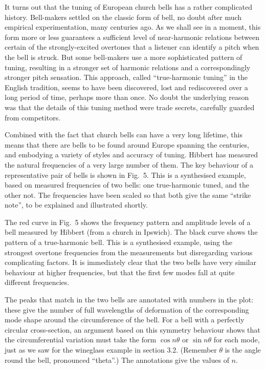   It turns out that the tuning of European church bells has a rather 
  complicated history. Bell-makers settled on the classic form of bell, no 
  doubt after much empirical experimentation, many centuries ago. As we shall 
  see in a moment, this form more or less guarantees a sufficient level of 
  near-harmonic relations between certain of the strongly-excited overtones 
  that a listener can identify a pitch when the bell is struck. But some 
  bell-makers use a more sophisticated pattern of tuning, resulting in a 
  stronger set of harmonic relations and a correspondingly stronger pitch 
  sensation. This approach, called ``true-harmonic tuning'' in the English 
  tradition, seems to have been discovered, lost and rediscovered over a long 
  period of time, perhaps more than once. No doubt the underlying reason was 
  that the details of this tuning method were trade secrets, carefully guarded 
  from competitors. 

  Combined with the fact that church bells can have a very long lifetime, this 
  means that there are bells to be found around Europe spanning the centuries, 
  and embodying a variety of styles and accuracy of tuning. Hibbert has 
  measured the natural frequencies of a very large number of them. The key 
  behaviour of a representative pair of bells is shown in Fig.\ 5. This is a 
  synthesised example, based on measured frequencies of two bells: one 
  true-harmonic tuned, and the other not. The frequencies have been scaled so 
  that both give the same ``strike note'', to be explained and illustrated 
  shortly. 

  The red curve in Fig.\ 5 shows the frequency pattern and amplitude levels of 
  a bell measured by Hibbert (from a church in Ipswich). The black curve shows 
  the pattern of a true-harmonic bell. This is a synthesised example, using the 
  strongest overtone frequencies from the measurements but disregarding various 
  complicating factors. It is immediately clear that the two bells have very 
  similar behaviour at higher frequencies, but that the first few modes fall at 
  quite different frequencies. 

  The peaks that match in the two bells are annotated with numbers in the plot: 
  these give the number of full wavelengths of deformation of the corresponding 
  mode shape around the circumference of the bell. For a bell with a perfectly 
  circular cross-section, an argument based on this symmetry behaviour shows 
  that the circumferential variation must take the form $\cos n \theta$ or 
  $\sin n \theta$ for each mode, just as we saw for the wineglass example in 
  section 3.2. (Remember $\theta$ is the angle round the bell, pronounced 
  ``theta''.) The annotations give the values of $n$. 

